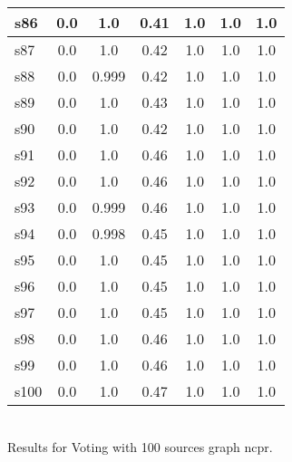 \documentclass{article}
\begin{document}
\begin{tabular}{|l|c|c|c|c|c|c|}
s86 &0.0 & 1.0 & 0.41 & 1.0 & 1.0 & 1.0\\
\hline
s87 &0.0 & 1.0 & 0.42 & 1.0 & 1.0 & 1.0\\
\hline
s88 &0.0 & 0.999 & 0.42 & 1.0 & 1.0 & 1.0\\
\hline
s89 &0.0 & 1.0 & 0.43 & 1.0 & 1.0 & 1.0\\
\hline
s90 &0.0 & 1.0 & 0.42 & 1.0 & 1.0 & 1.0\\
\hline
s91 &0.0 & 1.0 & 0.46 & 1.0 & 1.0 & 1.0\\
\hline
s92 &0.0 & 1.0 & 0.46 & 1.0 & 1.0 & 1.0\\
\hline
s93 &0.0 & 0.999 & 0.46 & 1.0 & 1.0 & 1.0\\
\hline
s94 &0.0 & 0.998 & 0.45 & 1.0 & 1.0 & 1.0\\
\hline
s95 &0.0 & 1.0 & 0.45 & 1.0 & 1.0 & 1.0\\
\hline
s96 &0.0 & 1.0 & 0.45 & 1.0 & 1.0 & 1.0\\
\hline
s97 &0.0 & 1.0 & 0.45 & 1.0 & 1.0 & 1.0\\
\hline
s98 &0.0 & 1.0 & 0.46 & 1.0 & 1.0 & 1.0\\
\hline
s99 &0.0 & 1.0 & 0.46 & 1.0 & 1.0 & 1.0\\
\hline
s100 &0.0 & 1.0 & 0.47 & 1.0 & 1.0 & 1.0\\
\hline
\end{tabular}\\

\noindent Results for Voting with 100 sources graph ncpr.
\end{document}
